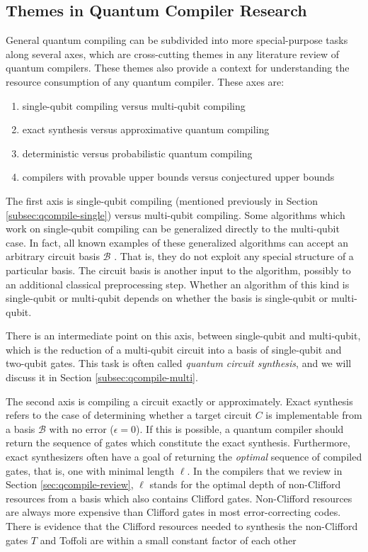 \subsection{Themes in Quantum Compiler Research}
\label{subsec:qcompile-themes}

General quantum compiling can be subdivided into more special-purpose tasks along several axes,
which are cross-cutting themes in any literature review of quantum compilers.
These themes also provide a context for understanding the resource consumption
of any quantum compiler. These axes are:
%
\begin{enumerate}
\item single-qubit compiling versus multi-qubit compiling
\item exact synthesis versus approximative quantum compiling
\item deterministic versus probabilistic quantum compiling
\item compilers with provable upper bounds versus conjectured upper bounds
\end{enumerate}
%
The first axis is 
single-qubit compiling
(mentioned previously in Section \ref{subsec:qcompile-single}) versus
multi-qubit compiling. Some algorithms which work on single-qubit compiling
can be generalized directly to the multi-qubit case. In fact, all known
examples of these generalized algorithms can accept an arbitrary circuit
basis $\mathcal{B}$ \cite{Amy2012,Dawson2005,Fowler2011,Booth2012}.
That is, they do not exploit any special structure of
a particular basis. The circuit basis is another input to the algorithm,
possibly to an additional classical preprocessing step. Whether an algorithm
of this kind is single-qubit or multi-qubit depends on whether the basis
is single-qubit or multi-qubit.

There is an intermediate point on this axis, between single-qubit and multi-qubit,
which is the reduction of a multi-qubit circuit into a basis of
single-qubit and two-qubit gates. This task is often called \emph{quantum circuit synthesis},
and we will discuss it in Section \ref{subsec:qcompile-multi}.

The second axis is compiling a circuit exactly or approximately.
Exact synthesis refers to the case of determining whether a
target circuit $C$ is implementable from a basis $\mathcal{B}$
with no error ($\epsilon = 0$). If this is possible, a quantum compiler
should return the sequence of gates which constitute the exact
synthesis. Furthermore, exact synthesizers often have a goal of
returning the \emph{optimal} sequence of compiled gates, that is,
one with minimal length $\ell$. In the compilers that we review
in Section \ref{sec:qcompile-review}, $\ell$ stands for the optimal
depth of non-Clifford resources from a basis which also contains Clifford
gates. Non-Clifford resources are always more expensive than
Clifford gates in most error-correcting codes. There is evidence
that the Clifford resources needed to synthesis the non-Clifford gates $T$
and Toffoli
are within a small constant factor of each other \cite{Eastin2012,Jones2012}

